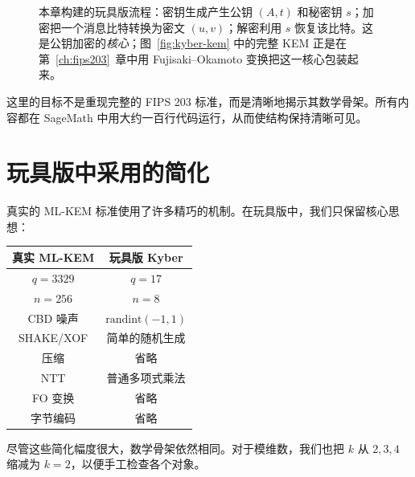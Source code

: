\begin{figure}[H]
\centering
{}
\caption{本章构建的玩具版流程：密钥生成产生公钥 $(A,t)$ 和秘密钥 $s$；加密把一个消息比特转换为密文 $(u,v)$；解密利用 $s$ 恢复该比特。这是公钥加密的\emph{核心}；图~\ref{fig:kyber-kem} 中的完整 KEM 正是在第~\ref{ch:fips203}~章中用 Fujisaki–Okamoto 变换把这一核心包装起来。}
\label{fig:toy-mlkem-pipeline}
\end{figure}

这里的目标不是重现完整的 FIPS 203 标准，而是清晰地揭示其数学骨架。所有内容都在 SageMath 中用大约一百行代码运行，从而使结构保持清晰可见。

\section{玩具版中采用的简化}

真实的 ML-KEM 标准使用了许多精巧的机制。在玩具版中，我们只保留核心思想：

\begin{table}[H]
\centering
\begin{tabular}{|c|c|}
\hline
真实 ML-KEM & 玩具版 Kyber \\
\hline
$q=3329$ & $q=17$ \\
\hline
$n=256$ & $n=8$ \\
\hline
CBD 噪声 & $\text{randint}(-1,1)$ \\
\hline
SHAKE/XOF & 简单的随机生成 \\
\hline
压缩 & 省略 \\
\hline
NTT & 普通多项式乘法 \\
\hline
FO 变换 & 省略 \\
\hline
字节编码 & 省略 \\
\hline
\end{tabular}
\end{table}

尽管这些简化幅度很大，数学骨架依然相同。对于模维数，我们也把 $k$ 从 $2,3,4$ 缩减为 $k=2$，以便手工检查各个对象。


